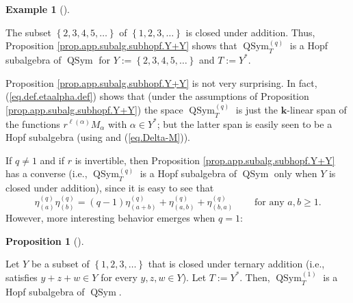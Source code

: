 \documentclass[numbers=enddot,12pt,final,onecolumn,notitlepage]{scrartcl}%
\theoremstyle{definition}
\newtheorem{prop}[theo]{Proposition}
\newenvironment{proposition}[1][]
{\begin{prop}[#1]\begin{leftbar}}
{\end{leftbar}\end{prop}}
\newtheorem{exam}[theo]{Example}
\newenvironment{example}[1][]
{\begin{exam}[#1]\begin{leftbar}}
{\end{leftbar}\end{exam}}
\begin{document}
\begin{example}
The subset $\left\{  2,3,4,5,\ldots\right\}  $ of $\left\{  1,2,3,\ldots
\right\}  $ is closed under addition. Thus, Proposition
\ref{prop.app.subalg.subhopf.Y+Y} shows that $\operatorname*{QSym}%
\nolimits_{T}^{\left(  q\right)  }$ is a Hopf subalgebra of
$\operatorname*{QSym}$ for $Y:=\left\{  2,3,4,5,\ldots\right\}  $ and
$T:=Y^{\ast}$.
\end{example}

Proposition \ref{prop.app.subalg.subhopf.Y+Y} is not very surprising. In fact,
(\ref{eq.def.etaalpha.def}) shows that (under the assumptions of Proposition
\ref{prop.app.subalg.subhopf.Y+Y}) the space $\operatorname*{QSym}%
\nolimits_{T}^{\left(  q\right)  }$ is just the $\mathbf{k}$-linear span of
the functions $r^{\ell\left(  \alpha\right)  }M_{\alpha}$ with $\alpha\in
Y^{\ast}$; but the latter span is easily seen to be a Hopf subalgebra (using
\cite[Proposition 5.1.3]{GriRei} and (\ref{eq.Delta-M})).

If $q\neq1$ and if $r$ is invertible, then Proposition
\ref{prop.app.subalg.subhopf.Y+Y} has a converse (i.e., $\operatorname*{QSym}%
\nolimits_{T}^{\left(  q\right)  }$ is a Hopf subalgebra of
$\operatorname*{QSym}$ only when $Y$ is closed under addition), since it is
easy to see that
\[
\eta_{\left(  a\right)  }^{\left(  q\right)  }\eta_{\left(  b\right)
}^{\left(  q\right)  }=\left(  q-1\right)  \eta_{\left(  a+b\right)
}^{\left(  q\right)  }+\eta_{\left(  a,b\right)  }^{\left(  q\right)  }%
+\eta_{\left(  b,a\right)  }^{\left(  q\right)  }\ \ \ \ \ \ \ \ \ \ \text{for
any }a,b\geq1.
\]
However, more interesting behavior emerges when $q=1$:

\begin{proposition}
\label{prop.app.subalg.subhopf.Y+Y+Y}Let $Y$ be a subset of $\left\{
1,2,3,\ldots\right\}  $ that is closed under ternary addition (i.e., satisfies
$y+z+w\in Y$ for every $y,z,w\in Y$). Let $T:=Y^{\ast}$. Then,
$\operatorname*{QSym}\nolimits_{T}^{\left(  1\right)  }$ is a Hopf subalgebra
of $\operatorname*{QSym}$.
\end{proposition}
\end{document}
